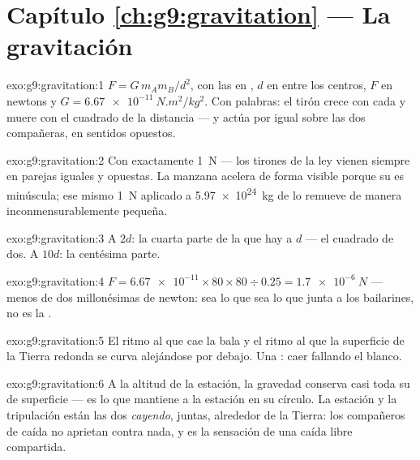 \section*{Capítulo \ref{ch:g9:gravitation} --- La gravitación}

\begin{solution}{exo:g9:gravitation:1}
$F = G \, m_A m_B / d^2$, con las  en , $d$ en
 entre los centros, $F$ en newtons y $G =
\qty{6.67e-11}{N.m^2/kg^2}$. Con palabras: el tirón crece con cada
 y muere con el cuadrado de la distancia --- y actúa por igual
sobre las dos compañeras, en sentidos opuestos.
\end{solution}

\begin{solution}{exo:g9:gravitation:2}
Con exactamente \qty{1}{N} --- los tirones de la ley vienen siempre en
parejas iguales y opuestas. La manzana acelera de forma visible porque
su  es minúscula; ese mismo \qty{1}{N} aplicado a
\qty{5.97e24}{kg} de  lo remueve de manera inconmensurablemente
pequeña.
\end{solution}

\begin{solution}{exo:g9:gravitation:3}
A $2d$: la cuarta parte de la  que hay a $d$ --- el cuadrado
de dos. A $10d$: la centésima parte.
\end{solution}

\begin{solution}{exo:g9:gravitation:4}
$F = \num{6.67e-11} \times 80 \times 80 \div 0.25 = \qty{1.7e-6}{N}$
--- menos de dos millonésimas de newton: sea lo que sea lo que junta a
los bailarines, no es la .
\end{solution}

\begin{solution}{exo:g9:gravitation:5}
El ritmo al que cae la bala y el ritmo al que la superficie de la
Tierra redonda se curva alejándose por debajo. Una : caer
fallando el blanco.
\end{solution}

\begin{solution}{exo:g9:gravitation:6}
A la altitud de la estación, la gravedad conserva casi toda su 
de superficie --- es lo que mantiene a la estación en su círculo. La
estación y la tripulación están las dos \emph{cayendo}, juntas,
alrededor de la Tierra: los compañeros de caída no aprietan contra
nada, y  es la sensación de una caída libre compartida.
\end{solution}

